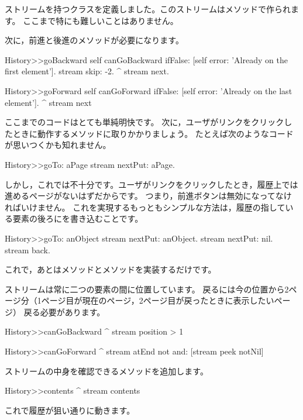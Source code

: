 \documentclass[a4paper,10pt,twoside]{book}
\begin{document}
ストリームを持つクラスを定義しました。このストリームはメソッドで作られます。
ここまで特にも難しいことはありません。

次に，前進と後進のメソッドが必要になります。

\begin{code}{}
History>>goBackward
  self canGoBackward ifFalse: [self error: 'Already on the first element'].
  stream skip: -2.
  ^ stream next.

History>>goForward
  self canGoForward ifFalse: [self error: 'Already on the last element'].
  ^ stream next
\end{code}

ここまでのコードはとても単純明快です。
次に，ユーザがリンクをクリックしたときに動作するメソッドに取りかかりましょう。
たとえば次のようなコードが思いつくかも知れません。

\begin{code}{}
History>>goTo: aPage
    stream nextPut: aPage.
\end{code}

しかし，これでは不十分です。ユーザがリンクをクリックしたとき，履歴上では進めるページがないはずだからです。
つまり，前進ボタンは無効になってなければいけません。
これを実現するもっともシンプルな方法は，履歴の指している要素の後ろにを書き込むことです。


\begin{code}{}
History>>goTo: anObject
  stream nextPut: anObject.
  stream nextPut: nil.
  stream back.
\end{code}

これで，あとはメソッドとメソッドを実装するだけです。

ストリームは常に二つの要素の間に位置しています。
戻るには今の位置から2ページ分（1ページ目が現在のページ，2ページ目が戻ったときに表示したいページ）
戻る必要があります。

\begin{code}{}
History>>canGoBackward
  ^ stream position > 1

History>>canGoForward
  ^ stream atEnd not and: [stream peek notNil]
\end{code}

ストリームの中身を確認できるメソッドを追加します。

\begin{code}{}
History>>contents
  ^ stream contents
\end{code}

これで履歴が狙い通りに動きます。
\end{document}
